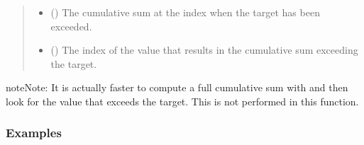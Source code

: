 \documentclass[letterpaper,10pt,english]{sphinxmanual}
\begin{document}
\begin{fulllineitems}
\begin{quote}
\begin{description}
\begin{itemize}
\end{itemize}

\sphinxAtStartPar
{}

\sphinxAtStartPar
\begin{itemize}
\item {}
\sphinxAtStartPar
{} () \textendash{} The cumulative sum at the index when the target has been exceeded.

\item {}
\sphinxAtStartPar
{} () \textendash{} The index of the value that results in the cumulative sum exceeding
the target.

\end{itemize}


\end{description}\end{quote}

\begin{sphinxadmonition}{note}{Note:}
\sphinxAtStartPar
It is actually faster to compute a full cumulative sum with  and
then look for the value that exceeds the target. This is not performed in
this function.
\end{sphinxadmonition}
\subsubsection*{Examples}

\begin{sphinxVerbatim}[commandchars=\\\{\}]
  
  
 
\end{sphinxVerbatim}

\end{fulllineitems}

\end{document}
